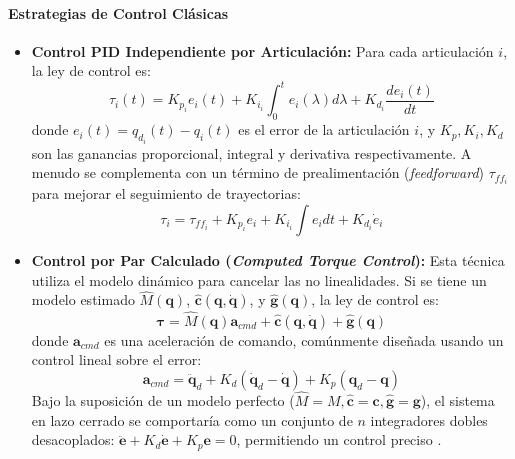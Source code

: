 \documentclass[12pt]{article}
\begin{document}
\paragraph{Estrategias de Control Clásicas}
\label{sssec:control_clasico}
\begin{itemize}
    \item \textbf{Control PID Independiente por Articulación:} Para cada articulación $i$, la ley de control es:
    \begin{equation}
    \tau_i(t) = K_{p_i} e_i(t) + K_{i_i} \int_0^t e_i(\lambda) d\lambda + K_{d_i} \frac{de_i(t)}{dt}
    \label{eq:pid_control}
    \end{equation}
    donde $e_i(t) = q_{d_i}(t) - q_i(t)$ es el error de la articulación $i$, y $K_p, K_i, K_d$ son las ganancias proporcional, integral y derivativa respectivamente. A menudo se complementa con un término de prealimentación (\textit{feedforward}) $\tau_{ff_i}$ para mejorar el seguimiento de trayectorias\cite{modern_robotics}:
    \begin{equation}
    \tau_i = \tau_{ff_i} + K_{p_i} e_i + K_{i_i} \int e_i dt + K_{d_i} \dot{e}_i
    \label{eq:pid_ff_control}
    \end{equation}
    

    \item \textbf{Control por Par Calculado (\textit{Computed Torque Control}):} Esta técnica utiliza el modelo dinámico para cancelar las no linealidades. Si se tiene un modelo estimado $\hat{M}(\bm{q})$, $\hat{\bm{c}}(\bm{q},\dot{\bm{q}})$, y $\hat{\bm{g}}(\bm{q})$, la ley de control es:
    \begin{equation}
    \bm{\tau} = \hat{M}(\bm{q})\bm{a}_{cmd} + \hat{\bm{c}}(\bm{q},\dot{\bm{q}}) + \hat{\bm{g}}(\bm{q})
    \label{eq:computed_torque}
    \end{equation}
    donde $\bm{a}_{cmd}$ es una aceleración de comando, comúnmente diseñada usando un control lineal sobre el error:
    \begin{equation}
    \bm{a}_{cmd} = \ddot{\bm{q}}_d + K_d (\dot{\bm{q}}_d - \dot{\bm{q}}) + K_p (\bm{q}_d - \bm{q})
    \label{eq:acmd_ctc}
    \end{equation}
    Bajo la suposición de un modelo perfecto ($\hat{M}=M, \hat{\bm{c}}=\bm{c}, \hat{\bm{g}}=\bm{g}$), el sistema en lazo cerrado se comportaría como un conjunto de $n$ integradores dobles desacoplados: $\ddot{\bm{e}} + K_d \dot{\bm{e}} + K_p \bm{e} = 0$, permitiendo un control preciso \cite{modern_robotics}.
\end{itemize}
\end{document}
